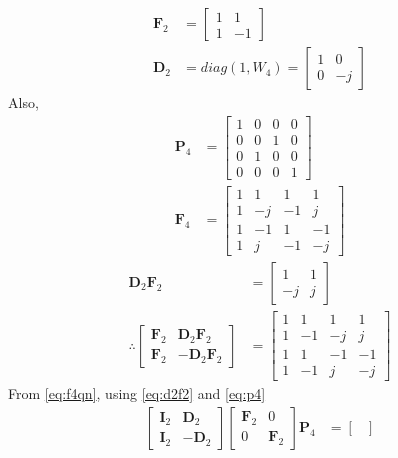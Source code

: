 \documentclass[journal,12pt,twocolumn]{IEEEtran}
\let\vec\mathbf
\numberwithin{equation}{section}
\renewcommand\thesection{\arabic{section}}
\begin{document}
\begin{enumerate}[label=\arabic*.,ref=\thesection.\theenumi]
\begin{align}
\vec{F}_{2}&=\begin{bmatrix}
1&1\\1&-1
\end{bmatrix}\\
\vec{D}_{2}&=diag(1,W_4)
=\begin{bmatrix}
1&0\\0&-j
\end{bmatrix}
\end{align}
Also,
\begin{align}
\label{eq:p4}
\vec{P}_{4}&=
\begin{bmatrix}
1&0&0&0\\0&0&1&0\\0&1&0&0\\0&0&0&1
\end{bmatrix}\\
\vec{F}_{4}&=
\begin{bmatrix}
1&1&1&1\\1&-j&-1&j\\1&-1&1&-1\\1&j&-1&-j
\end{bmatrix}
\end{align}
\begin{align}
\vec{D}_{2}\vec{F}_{2}&=
\begin{bmatrix}
1&1\\-j&j
\end{bmatrix}\\
\therefore
\begin{bmatrix}
\vec{F}_{2} & \vec{D}_{2}\vec{F}_{2} \\
\vec{F}_{2} & -\vec{D}_{2}\vec{F}_{2}
\end{bmatrix}&=
\begin{bmatrix}
1&1&1&1\\1&-1&-j&j\\1&1&-1&-1\\1&-1&j&-j
\end{bmatrix}
\label{eq:d2f2}
\end{align}
From \eqref{eq:f4qn}, using \eqref{eq:d2f2} and \eqref{eq:p4}
\begin{align}
\begin{bmatrix}
	\vec{I}_{2} & \vec{D}_{2} \\
\vec{I}_{2} & -\vec{D}_{2}
\end{bmatrix}
\begin{bmatrix}
\vec{F}_{2} & 0 \\
0 & \vec{F}_{2}
\end{bmatrix}
\vec{P}_{4}&=
\begin{bmatrix}

\end{bmatrix}
\end{align}
\end{enumerate}
\end{document}
